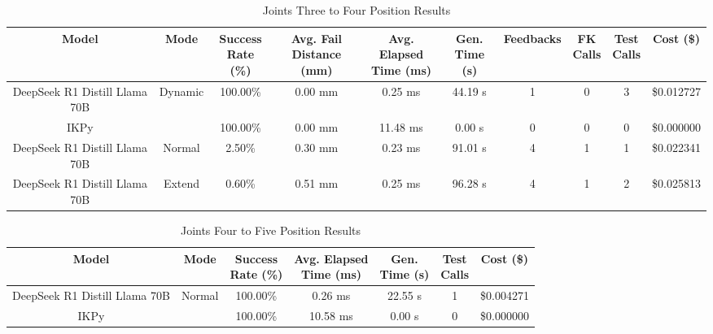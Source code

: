 \begin{table}[H]
\tiny
\renewcommand{\arraystretch}{1.2}
\caption{Joints Three to Four Position Results}
\begin{center}
\begin{tabular}{|c|c|c|c|c|c|c|c|c|c|}
    \hline
    \textbf{Model} & 
    \textbf{Mode} & 
    \makecell{\textbf{Success}\\\textbf{Rate (\%)}} &
    \makecell{\textbf{Avg. Fail}\\\textbf{Distance (mm)}} &
    \makecell{\textbf{Avg. Elapsed}\\\textbf{Time (ms)}} &
    \makecell{\textbf{Gen.}\\\textbf{Time (s)}} &
    \textbf{Feedbacks} &
    \makecell{\textbf{FK}\\\textbf{Calls}} &
    \makecell{\textbf{Test}\\\textbf{Calls}} &
    \textbf{Cost (\$)} \\
    \hline
    DeepSeek R1 Distill Llama 70B & Dynamic & 100.00\% & 0.00 mm & 0.25 ms & 44.19 s & 1 & 0 & 3 & \$0.012727 \\
    \hline
    IKPy &  & 100.00\% & 0.00 mm & 11.48 ms & 0.00 s & 0 & 0 & 0 & \$0.000000 \\
    \hline
    DeepSeek R1 Distill Llama 70B & Normal & 2.50\% & 0.30 mm & 0.23 ms & 91.01 s & 4 & 1 & 1 & \$0.022341 \\
    \hline
    DeepSeek R1 Distill Llama 70B & Extend & 0.60\% & 0.51 mm & 0.25 ms & 96.28 s & 4 & 1 & 2 & \$0.025813 \\
    \hline
\end{tabular}
\label{Results-Position-3-4}
\end{center}
\end{table}

\begin{table}[H]
\tiny
\renewcommand{\arraystretch}{1.2}
\caption{Joints Four to Five Position Results}
\begin{center}
\begin{tabular}{|c|c|c|c|c|c|c|}
    \hline
    \textbf{Model} & 
    \textbf{Mode} & 
    \makecell{\textbf{Success}\\\textbf{Rate (\%)}} &
    \makecell{\textbf{Avg. Elapsed}\\\textbf{Time (ms)}} &
    \makecell{\textbf{Gen.}\\\textbf{Time (s)}} &
    \makecell{\textbf{Test}\\\textbf{Calls}} &
    \textbf{Cost (\$)} \\
    \hline
    DeepSeek R1 Distill Llama 70B & Normal & 100.00\% & 0.26 ms & 22.55 s & 1 & \$0.004271 \\
    \hline
    IKPy &  & 100.00\% & 10.58 ms & 0.00 s & 0 & \$0.000000 \\
    \hline
\end{tabular}
\label{Results-Position-4-5}
\end{center}
\end{table}

